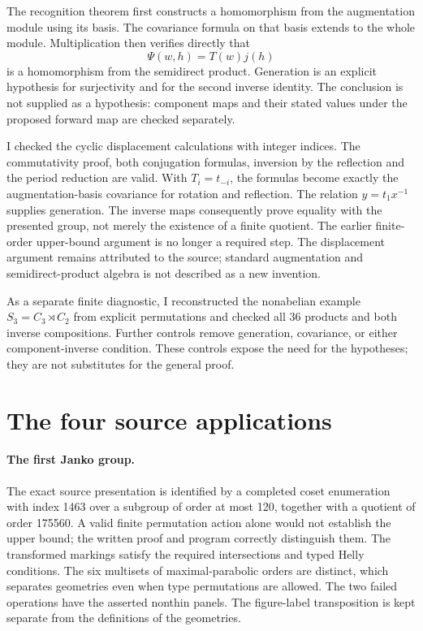 \documentclass[11pt]{article}
\begin{document}
The recognition theorem first constructs a homomorphism from the augmentation
module using its basis. The covariance formula on that basis extends to the
whole module. Multiplication then verifies directly that
\[
        \Psi(w,h)=T(w)j(h)
\]
is a homomorphism from the semidirect product. Generation is an explicit
hypothesis for surjectivity and for the second inverse identity. The conclusion
is not supplied as a hypothesis: component maps and their stated values under
the proposed forward map are checked separately.

I checked the cyclic displacement calculations with integer indices. The
commutativity proof, both conjugation formulas, inversion by the reflection and
the period reduction are valid. With $T_i=t_{-i}$, the formulas become exactly
the augmentation-basis covariance for rotation and reflection. The relation
$y=t_1x^{-1}$ supplies generation. The inverse maps consequently prove equality
with the presented group, not merely the existence of a finite quotient. The
earlier finite-order upper-bound argument is no longer a required step. The
displacement argument remains attributed to the source; standard augmentation
and semidirect-product algebra is not described as a new invention.

As a separate finite diagnostic, I reconstructed the nonabelian example
$S_3=C_3\rtimes C_2$ from explicit permutations and checked all 36 products and
both inverse compositions. Further controls remove generation, covariance, or
either component-inverse condition. These controls expose the need for the
hypotheses; they are not substitutes for the general proof.

\section{The four source applications}

\paragraph{The first Janko group.}
The exact source presentation is identified by a completed coset enumeration
with index 1463 over a subgroup of order at most 120, together with a quotient
of order 175560. A valid finite permutation action alone would not establish
the upper bound; the written proof and program correctly distinguish them.
The transformed markings satisfy the required intersections and typed Helly
conditions. The six multisets of maximal-parabolic orders are distinct, which
separates geometries even when type permutations are allowed. The two failed
operations have the asserted nonthin panels. The figure-label transposition is
kept separate from the definitions of the geometries.
\end{document}
